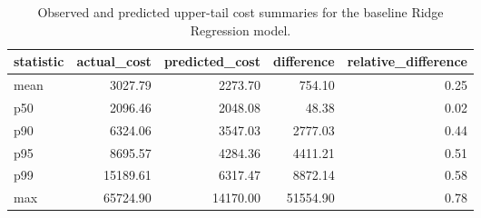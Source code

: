\begin{table}
\caption{Observed and predicted upper-tail cost summaries for the baseline Ridge Regression model.}
\label{tab:03-ridge-tail-summary}
\begin{tabular}{lrrrr}
\toprule
statistic & actual_cost & predicted_cost & difference & relative_difference \\
\midrule
mean & 3027.79 & 2273.70 & 754.10 & 0.25 \\
p50 & 2096.46 & 2048.08 & 48.38 & 0.02 \\
p90 & 6324.06 & 3547.03 & 2777.03 & 0.44 \\
p95 & 8695.57 & 4284.36 & 4411.21 & 0.51 \\
p99 & 15189.61 & 6317.47 & 8872.14 & 0.58 \\
max & 65724.90 & 14170.00 & 51554.90 & 0.78 \\
\bottomrule
\end{tabular}
\end{table}
